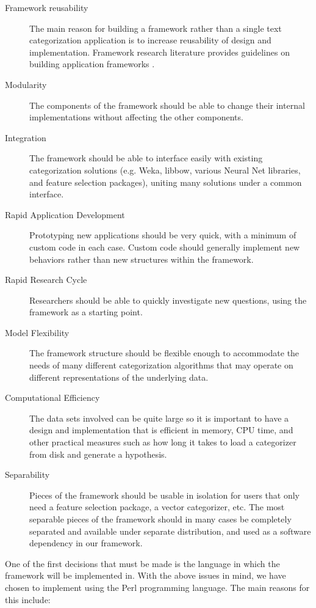 \documentclass[a4paper,twocolumn]{article}
\begin{document}
\begin{description}
\item[Framework reusability] The main reason for building a framework rather than a single text categorization application is to increase reusability of design and implementation.  Framework research literature provides guidelines on building application frameworks \cite{fayad:99}.
\item[Modularity] The components of the framework should be able to change their internal implementations without affecting the other components.
\item[Integration] The framework should be able to interface easily with existing categorization solutions (e.g. Weka, libbow, various Neural Net libraries, and feature selection packages), uniting many solutions under a common interface.
\item[Rapid Application Development] Prototyping new applications should be very quick, with a minimum of custom code in each case.  Custom code should generally implement new behaviors rather than new structures within the framework.
\item[Rapid Research Cycle] Researchers should be able to quickly investigate new questions, using the framework as a starting point.
\item[Model Flexibility] The framework structure should be flexible enough to accommodate the needs of many different categorization algorithms that may operate on different representations of the underlying data.
\item[Computational Efficiency] The data sets involved can be quite large so it is important to have a design and implementation that is efficient in memory, CPU time, and other practical measures such as how long it takes to load a categorizer from disk and generate a hypothesis.
\item[Separability] Pieces of the framework should be usable in isolation for users that only need a feature selection package, a vector categorizer, etc.  The most separable pieces of the framework should in many cases be completely separated and available under separate distribution, and used as a software dependency in our framework.
\end{description}

One of the first decisions that must be made is the language in which the framework will be implemented in.  With the above issues in mind, we have chosen to implement using the Perl programming language. \cite{Wall:00}  The main reasons for this include:
\end{document}
